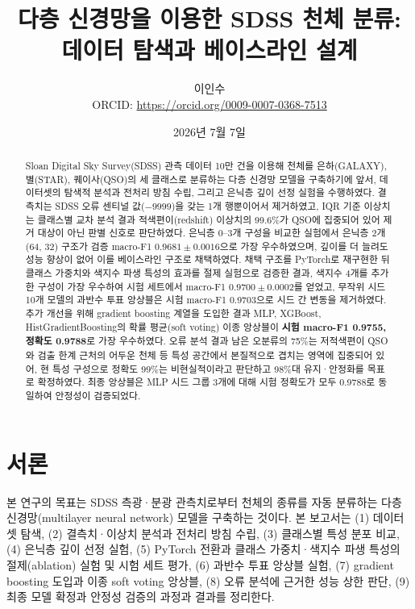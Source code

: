 \documentclass[11pt,a4paper]{article}
\title{다층 신경망을 이용한 SDSS 천체 분류:\\데이터 탐색과 베이스라인 설계}
\author{이인수\\[3pt]
\small ORCID: \url{https://orcid.org/0009-0007-0368-7513}}
\date{2026년 7월 7일}
\begin{document}
\maketitle

\begin{abstract}
Sloan Digital Sky Survey(SDSS) 관측 데이터 10만 건을 이용해 천체를 은하(GALAXY),
별(STAR), 퀘이사(QSO)의 세 클래스로 분류하는 다층 신경망 모델을 구축하기에 앞서,
데이터셋의 탐색적 분석과 전처리 방침 수립, 그리고 은닉층 깊이 선정 실험을 수행하였다.
결측치는 SDSS 오류 센티널 값($-9999$)을 갖는 1개 행뿐이어서 제거하였고, IQR 기준
이상치는 클래스별 교차 분석 결과 적색편이(redshift) 이상치의 99.6\%가 QSO에
집중되어 있어 제거 대상이 아닌 판별 신호로 판단하였다. 은닉층 0--3개 구성을 비교한
실험에서 은닉층 2개(64, 32) 구조가 검증 macro-F1 $0.9681 \pm 0.0016$으로 가장
우수하였으며, 깊이를 더 늘려도 성능 향상이 없어 이를 베이스라인 구조로 채택하였다.
채택 구조를 PyTorch로 재구현한 뒤 클래스 가중치와 색지수 파생 특성의 효과를 절제
실험으로 검증한 결과, 색지수 4개를 추가한 구성이 가장 우수하여 시험 세트에서
macro-F1 $0.9700 \pm 0.0002$를 얻었고, 무작위 시드 10개 모델의 과반수 투표
앙상블은 시험 macro-F1 0.9703으로 시드 간 변동을 제거하였다. 추가 개선을 위해
gradient boosting 계열을 도입한 결과 MLP, XGBoost, HistGradientBoosting의 확률
평균(soft voting) 이종 앙상블이 \textbf{시험 macro-F1 0.9755, 정확도 0.9788}로
가장 우수하였다. 오류 분석 결과 남은 오분류의 75\%는 저적색편이 QSO와 검출 한계
근처의 어두운 천체 등 특성 공간에서 본질적으로 겹치는 영역에 집중되어 있어, 현
특성 구성으로 정확도 99\%는 비현실적이라고 판단하고 98\%대 유지·안정화를 목표로
확정하였다. 최종 앙상블은 MLP 시드 그룹 3개에 대해 시험 정확도가 모두 0.9788로
동일하여 안정성이 검증되었다.
\end{abstract}

\section{서론}

본 연구의 목표는 SDSS 측광·분광 관측치로부터 천체의 종류를 자동 분류하는 다층
신경망(multilayer neural network) 모델을 구축하는 것이다. 본 보고서는 (1) 데이터셋
탐색, (2) 결측치·이상치 분석과 전처리 방침 수립, (3) 클래스별 특성 분포 비교,
(4) 은닉층 깊이 선정 실험, (5) PyTorch 전환과 클래스 가중치·색지수 파생 특성의
절제(ablation) 실험 및 시험 세트 평가, (6) 과반수 투표 앙상블 실험,
(7) gradient boosting 도입과 이종 soft voting 앙상블, (8) 오류 분석에 근거한
성능 상한 판단, (9) 최종 모델 확정과 안정성 검증의 과정과 결과를 정리한다.
\end{document}
